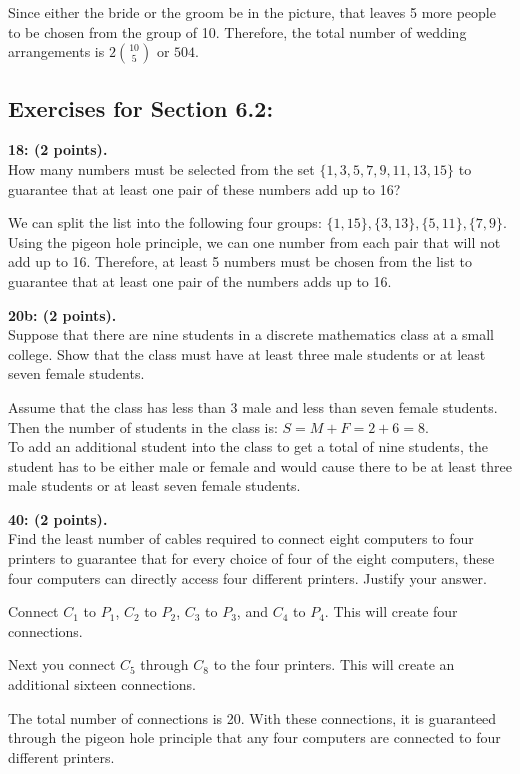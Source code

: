 \documentclass[12pt]{article}  %
\begin{document}
\noindent
Since either the bride or the groom be in the picture, that leaves 5 more people to be chosen from the group of 10. Therefore, the total number of wedding arrangements is $\displaystyle2\binom{10}{5}$ or $504$.

\clearpage
\subsection*{Exercises for Section 6.2:}     
\noindent
{\bf 18: (2 points).}\\
How many numbers must be selected from the set $\{1,3,5,7,9,11,13,15\}$ to guarantee that at least one pair of these numbers add up to 16?

\noindent
We can split the list into the following four groups: $\{1,15\},\{3,13\},\{5,11\},\{7,9\}$. Using the pigeon hole principle, we can one number from each pair that will not add up to 16. Therefore, at least 5 numbers must be chosen from the list to guarantee that at least one pair of the numbers adds up to 16.

\noindent
{\bf 20b: (2 points).}\\
\noindent
Suppose that there are nine students in a discrete mathematics class at a small college. Show that the class must have at least three male students or at least seven female students.

\noindent
Assume that the class has less than 3 male and less than seven female students.
Then the number of students in the class is: $S=M+F=2+6=8$.\\
To add an additional student into the class to get a total of nine students, the student has to be either male or female and would cause there to be at least three male students or at least seven female students.


\noindent
{\bf 40: (2 points).}\\
\noindent
Find the least number of cables required to connect eight computers to four printers to guarantee that for every choice of four of the eight computers, these four computers can directly access four different printers. Justify your answer.

\noindent
Connect $C_1$ to $P_1$, $C_2$ to $P_2$, $C_3$ to $P_3$, and $C_4$ to $P_4$. This will create four connections.

\noindent
Next you connect $C_5$ through $C_8$ to the four printers. This will create an additional sixteen connections.

\noindent
The total number of connections is 20. With these connections, it is guaranteed through the pigeon hole principle that any four computers are connected to four different printers.
\end{document}
